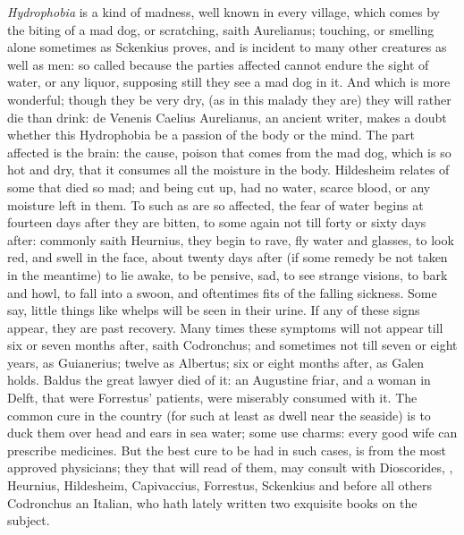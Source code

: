 \emph{Hydrophobia} is a kind of madness, well known in every village, which
comes by the biting of a mad dog, or scratching, saith
Aurelianus; touching, or smelling alone sometimes as
Sckenkius proves, and is incident to many other creatures
as well as men: so called because the parties affected cannot endure the sight
of water, or any liquor, supposing still they see a mad dog in it. And which is
more wonderful; though they be very dry, (as in this malady they are) they will
rather die than drink: de Venenis Caelius Aurelianus, an
ancient writer, makes a doubt whether this Hydrophobia be a passion of the body
or the mind. The part affected is the brain: the cause, poison that comes from
the mad dog, which is so hot and dry, that it consumes all the moisture in the
body. Hildesheim relates of some that died so mad; and
being cut up, had no water, scarce blood, or any moisture left in them. To such
as are so affected, the fear of water begins at fourteen days after they are
bitten, to some again not till forty or sixty days after: commonly saith
Heurnius, they begin to rave, fly water and glasses, to look red, and swell in
the face, about twenty days after (if some remedy be not taken in the meantime)
to lie awake, to be pensive, sad, to see strange visions, to bark and howl, to
fall into a swoon, and oftentimes fits of the falling sickness.
Some say, little things like whelps will be seen in their
urine. If any of these signs appear, they are past recovery. Many times these
symptoms will not appear till six or seven months after, saith
Codronchus; and sometimes not till seven or eight years, as
Guianerius; twelve as Albertus; six or eight months after, as Galen holds.
Baldus the great lawyer died of it: an Augustine friar, and a woman in Delft,
that were Forrestus' patients, were miserably consumed with
it. The common cure in the country (for such at least as dwell near the
seaside) is to duck them over head and ears in sea water; some use charms:
every good wife can prescribe medicines. But the best cure to be had in such
cases, is from the most approved physicians; they that will read of them, may
consult with Dioscorides, , Heurnius,
Hildesheim, Capivaccius, Forrestus, Sckenkius and before all others Codronchus
an Italian, who hath lately written two exquisite books on the subject.

